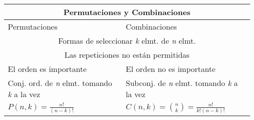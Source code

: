 \begin{minipage}{0.22\textwidth}
	\begin{center}\small{
			\begin{tabular}{  p{2.4cm} |  p{2.4cm} }
				\multicolumn{2}{c}{\bf Permutaciones y Combinaciones}                                                                                \\ \hline
				Permutaciones                                                  & Combinaciones                                                       \\ \hline
				\multicolumn{2}{c}{Formas de seleccionar {\textit{k}} elmt. de {\textit{n}} elmt.}                                                   \\ \hline
				\multicolumn{2}{c}{Las repeticiones no est\'{a}n permitidas}                                                                         \\ \hline
				El orden es importante                                         & El orden no es importante                                           \\ \hline
				Conj. ord. de {\textit{n}} elmt. tomando {\textit{k}} a la vez & Subconj. de {\textit{n}} elmt. tomando {\textit{k}} a la vez        \\ \hline
				$P({\textit{n}},{\textit{k}}) = \frac{n!}{(n-k)!}$             & $C({\textit{n}},{\textit{k}}) = \binom{n}{k} = \frac{n!}{k!(n-k)!}$ \\ \hline
			\end{tabular}
		}\end{center}
\end{minipage}


